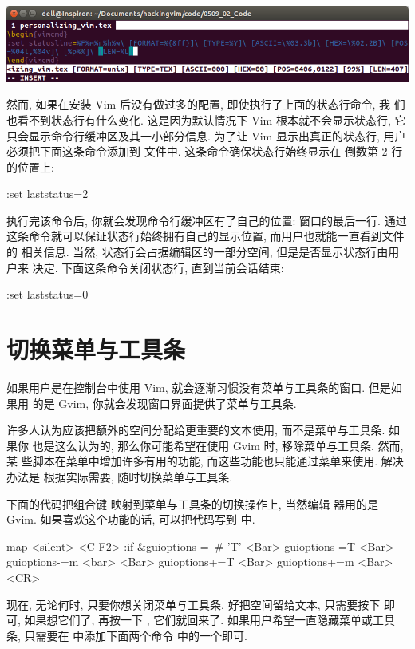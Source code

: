 \begin{center}
    \includegraphics[scale=0.55]{images/page27.png}
\end{center}
然而, 如果在安装 Vim 后没有做过多的配置, 即使执行了上面的状态行命令, 我
们也看不到状态行有什么变化. 这是因为默认情况下 Vim 根本就不会显示状态行,
它只会显示命令行缓冲区及其一小部分信息. 为了让 Vim 显示出真正的状态行, 用户
必须把下面这条命令添加到  文件中. 这条命令确保状态行始终显示在
倒数第 2 行的位置上:
\begin{vimcmd}
:set laststatus=2
\end{vimcmd}
执行完该命令后, 你就会发现命令行缓冲区有了自己的位置: 窗口的最后一行. 通过
这条命令就可以保证状态行始终拥有自己的显示位置, 而用户也就能一直看到文件的
相关信息. 当然, 状态行会占据编辑区的一部分空间, 但是是否显示状态行由用户来
决定. 下面这条命令关闭状态行, 直到当前会话结束:
\begin{vimcmd}
:set laststatus=0
\end{vimcmd}

\section{切换菜单与工具条}
\label{sec:toggle_menu_and_toolbar}
如果用户是在控制台中使用 Vim, 就会逐渐习惯没有菜单与工具条的窗口. 但是如果用
的是 Gvim, 你就会发现窗口界面提供了菜单与工具条.

许多人认为应该把额外的空间分配给更重要的文本使用, 而不是菜单与工具条. 如果你 
也是这么认为的, 那么你可能希望在使用 Gvim 时, 移除菜单与工具条. 然而, 某
些脚本在菜单中增加许多有用的功能, 而这些功能也只能通过菜单来使用. 解决办法是
根据实际需要, 随时切换菜单与工具条.

下面的代码把组合键  映射到菜单与工具条的切换操作上, 当然编辑
器用的是 Gvim. 如果喜欢这个功能的话, 可以把代码写到  中.
\begin{vimcmd}
map <silent> <C-F2> :if &guioptions =~# 'T' <Bar>
                         \set guioptions-=T <Bar>
                         \set guioptions-=m <bar>
                    \else <Bar>
                         \set guioptions+=T <Bar>
                         \set guioptions+=m <Bar>
                      \endif<CR>
\end{vimcmd}
现在, 无论何时, 只要你想关闭菜单与工具条, 好把空间留给文本, 只需要按下
 即可, 如果想它们了, 再按一下 , 它们就回来了.
如果用户希望一直隐藏菜单或工具条, 只需要在  中添加下面两个命令
中的一个即可.


